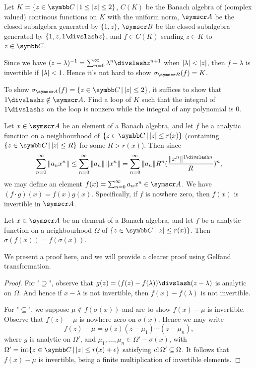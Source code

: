 \begin{example}
  Let $K = \{z\in\CC\VERT 1\leq\ABS{z}\leq 2\}$, $C(K)$ be the Banach algebra of (complex valued) continous functions on $K$ with the uniform norm, $\BA A$ be the closed subalgebra generated by $\{1, z\}$, $\BA B$ be the closed subalgebra generated by $\{1, z, 1\DIV z\}$, and $f\in C(K)$ sending $z\in K$ to $z\in\CC$.

  Since we have $(z-\lambda)^{-1}=\sum_{n=0}^\infty \lambda^n\DIV z^{n+1}$ when $\vert\lambda\vert<\vert z\vert$, then $f-\lambda$ is invertible if $\vert\lambda\vert < 1$. Hence it's not hard to show $\sigma_{\BA B}(f)=K$.

  To show $\sigma_{\BA A}(f)=\{z\in\CC\VERT \ABS{z}\leq 2\}$, it suffices to show that $1\DIV z\notin \BA A$. Find a loop of $K$ such that the integral of $1\DIV z$ on the loop is nonzero while the integral of any polynomial is 0.
\end{example}

Let $x\in \BA A$ be an element of a Banach algebra, and let $f$ be a analytic function on a neighbourhood of $\{z\in\CC\VERT \ABS{z}\leq r(x)\}$ (containing $\{z\in\CC\VERT \ABS{z}\leq R\}$ for some $R>r(x)$). Then since
\begin{equation*}
  \sum_{n=0}^\infty \NORM{a_nx^n}\leq\sum_{n=0}^\infty\NORM{a_n}\,\NORM{x^n}=\sum_{n=0}^\infty \NORM{a_n}R^n(\frac{\NORM{x^n}^{1\DIV n}}{R})^n,
\end{equation*}
we may define an element $f(x)=\sum_{n=0}^\infty a_nx^n\in \BA A$. We have $(f\cdot g)(x)=f(x)g(x)$. Specifically, if $f$ is nowhere zero, then $f(x)$ is invertible in $\BA A$.

\begin{theorem}
  Let $x\in \BA A$ be an element of a Banach algebra, and let $f$ be a analytic function on a neighbourhood $\Omega$ of $\{z\in\CC\VERT \ABS{z}\leq r(x)\}$. Then $\sigma(f(x))=f(\sigma(x))$.
\end{theorem}

We present a proof here, and we will provide a clearer proof using Gelfand transformation.

\begin{proof}
  For "$\supseteq$", observe that $g(z)=(f(z)-f(\lambda))\DIV (z-\lambda)$ is analytic on $\Omega$. And hence if $x-\lambda$ is not invertible, then $f(x)-f(\lambda)$ is not invertible.

  For "$\subseteq$", we suppose $\mu\notin f(\sigma(x))$ and are to show $f(x)-\mu$ is invertible. Observe that $f(z)-\mu$ is nowhere zero on $\sigma(x)$. Hence we may write
  \begin{equation*}
    f(z)-\mu=g(z)(z-\mu_1)\dotsb(z-\mu_n),
  \end{equation*}
  where $g$ is analytic on $\Omega'$, and $\mu_1, \dotsc, \mu_n\in\Omega'-\sigma(x)$, with $\Omega'=\INT \{z\in\CC\VERT \ABS{z}\leq r(x)+\epsilon\}$ satisfying $\operatorname{cl}\Omega'\subseteq\Omega$. It follows that $f(x)-\mu$ is invertible, being a finite multiplication of invertible elements.
\end{proof}

